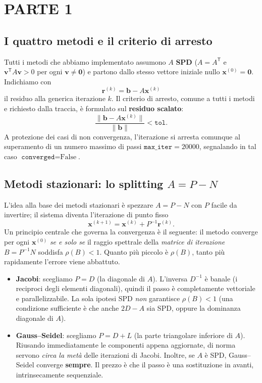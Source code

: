 \documentclass[11pt,a4paper]{article}
\begin{document}
\section{PARTE 1}

\subsection{I quattro metodi e il criterio di arresto}
Tutti i metodi che abbiamo implementato assumono $A$ \textbf{SPD}
($A=A^{\mathsf{T}}$ e $\mathbf{v}^{\mathsf{T}}A\mathbf{v}>0$ per ogni
$\mathbf{v}\neq\mathbf{0}$) e partono dallo stesso vettore iniziale nullo
$\mathbf{x}^{(0)}=\mathbf{0}$. Indichiamo con
\[
  \mathbf{r}^{(k)}=\mathbf{b}-A\mathbf{x}^{(k)}
\]
il residuo alla generica iterazione $k$. Il criterio di arresto, comune a tutti i
metodi e richiesto dalla traccia, è formulato sul \textbf{residuo scalato}:
\[
  \frac{\lVert\mathbf{b}-A\mathbf{x}^{(k)}\rVert}{\lVert\mathbf{b}\rVert}
  < \texttt{tol}.
\]
A protezione dei casi di non convergenza, l'iterazione si arresta comunque al
superamento di un numero massimo di passi $\texttt{max\_iter}=20000$, segnalando
in tal caso $\texttt{converged}=\text{False}$.

\subsection{Metodi stazionari: lo splitting \texorpdfstring{$A=P-N$}{A=P-N}}
L'idea alla base dei metodi stazionari è spezzare $A=P-N$ con $P$ facile da
invertire; il sistema diventa l'iterazione di punto fisso
\[
  \mathbf{x}^{(k+1)} = \mathbf{x}^{(k)} + P^{-1}\mathbf{r}^{(k)} .
\]
Un principio centrale che governa la convergenza è il seguente: il metodo
converge per ogni $\mathbf{x}^{(0)}$ \emph{se e solo se} il raggio spettrale
della \emph{matrice di iterazione} $B=P^{-1}N$ soddisfa $\rho(B)<1$. Quanto più
piccolo è $\rho(B)$, tanto più rapidamente l'errore viene abbattuto.

\begin{itemize}[leftmargin=1.6em]
  \item \textbf{Jacobi}: scegliamo $P=D$ (la diagonale di $A$). L'inversa
  $D^{-1}$ è banale (i reciproci degli elementi diagonali), quindi il passo è
  completamente vettoriale e parallelizzabile. La sola ipotesi SPD \emph{non}
  garantisce $\rho(B)<1$ (una condizione sufficiente è che anche $2D-A$ sia SPD,
  oppure la dominanza diagonale di $A$).
  \item \textbf{Gauss--Seidel}: scegliamo $P=D+L$ (la parte triangolare
  inferiore di $A$). Riusando immediatamente le componenti appena aggiornate, di
  norma servono \emph{circa la metà} delle iterazioni di Jacobi. Inoltre, se $A$
  è SPD, Gauss--Seidel converge \textbf{sempre}. Il prezzo è che il passo è una
  sostituzione in avanti, intrinsecamente sequenziale.
\end{itemize}
\end{document}
